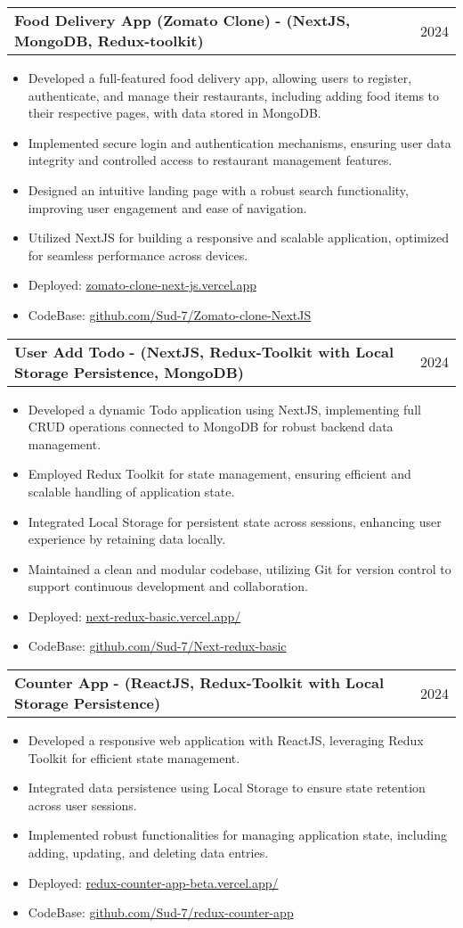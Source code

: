 \documentclass[letterpaper,10pt]{article}
\makeatletter
\newcommand{\resumeItem}[1]{
  \item\small{
    {#1 \vspace{-2pt}}
  }
}
\newcommand{\resumeProjectHeading}[2]{
    \vspace{-2pt}\item
    \begin{tabular*}{0.97\textwidth}[t]{l@{\extracolsep{\fill}}r}
      \small#1 & #2 \\
    \end{tabular*}\vspace{-7pt}
}
\newcommand{\resumeItemListStart}{\begin{itemize}}
\newcommand{\resumeItemListEnd}{\end{itemize}\vspace{-5pt}}
\makeatother
\begin{document}
    \resumeProjectHeading
      {\textbf{Food Delivery App (Zomato Clone)} \textbf{- (NextJS, MongoDB, Redux-toolkit) }}{2024}
        \resumeItemListStart
            \resumeItem{Developed a full-featured food delivery app, allowing users to register, authenticate, and manage their restaurants, including adding food items to their respective pages, with data stored in MongoDB.}
            \resumeItem{Implemented secure login and authentication mechanisms, ensuring user data integrity and controlled access to restaurant management features.
}
            \resumeItem{Designed an intuitive landing page with a robust search functionality, improving user engagement and ease of navigation.}
\resumeItem{Utilized NextJS for building a responsive and scalable application, optimized for seamless performance across devices.}
            \resumeItem{Deployed: \href{https://zomato-clone-next-js.vercel.app}{zomato-clone-next-js.vercel.app}} 
            \resumeItem{{CodeBase: \href{https://github.com/Sud-7/Zomato-clone-NextJS}{github.com/Sud-7/Zomato-clone-NextJS}}}
        \resumeItemListEnd

    
    \resumeProjectHeading
      {\textbf{User Add Todo}  \textbf {- (NextJS, Redux-Toolkit with Local Storage Persistence, MongoDB) }} {2024}
        \resumeItemListStart
            \resumeItem{Developed a dynamic Todo application using NextJS, implementing full CRUD operations connected to MongoDB for robust backend data management.}
            \resumeItem{Employed Redux Toolkit for state management, ensuring efficient and scalable handling of application state.}
            \resumeItem{Integrated Local Storage for persistent state across sessions, enhancing user experience by retaining data locally.}
\resumeItem{Maintained a clean and modular codebase, utilizing Git for version control to support continuous development and collaboration.}
            \resumeItem{Deployed: \href{https://next-redux-basic.vercel.app/}{next-redux-basic.vercel.app/}}
            \resumeItem{CodeBase: \href{https://github.com/Sud-7/Next-redux-basic}{github.com/Sud-7/Next-redux-basic}}
        \resumeItemListEnd
    
    \resumeProjectHeading
      {\textbf{Counter App}  \textbf {- (ReactJS, Redux-Toolkit with Local Storage Persistence) }}{2024}
        \resumeItemListStart
            \resumeItem{Developed a responsive web application with ReactJS, leveraging Redux Toolkit for efficient state management.}
            \resumeItem{Integrated data persistence using Local Storage to ensure state retention across user sessions.}
            \resumeItem{Implemented robust functionalities for managing application state, including adding, updating, and deleting data entries.}
            \resumeItem{Deployed: \href{https://redux-counter-app-beta.vercel.app/}{redux-counter-app-beta.vercel.app/}}
            \resumeItem{CodeBase: \href{https://github.com/Sud-7/redux-counter-app}{github.com/Sud-7/redux-counter-app}}
        \resumeItemListEnd
    
\end{document}
